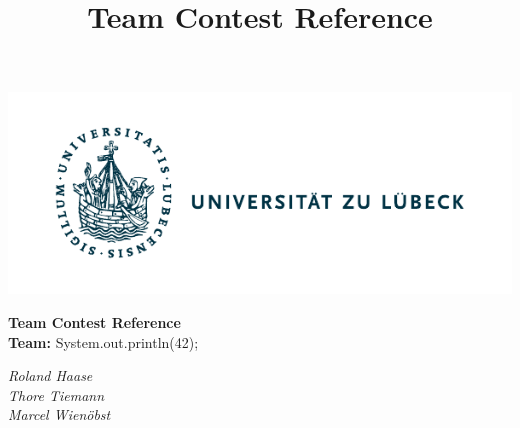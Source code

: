 \documentclass[10pt,a4paper,ngerman,oneside,]{article}
\title{Team Contest Reference}
\author{\university}
\newcommand\teamname{System.out.println(42);}
\newcommand\teammembers{Roland Haase\\ Thore Tiemann\\ Marcel Wienöbst}
\begin{document}
\vspace{-5mm}
\begin{center}
	\begin{minipage}{0.3\textwidth}
	  \includegraphics[scale=.8,clip,trim=.4cm 0cm 6.4cm 0cm,scale=0.89]{img/logo_uzl.pdf}
    \end{minipage}
	\begin{minipage}{0.35\textwidth}
      \begin{center}
	    \LARGE{\bfseries Team Contest Reference}\\
        \textbf{Team:} {\teamname}
      \end{center}
    \end{minipage}
	\begin{minipage}{0.3\textwidth}
      \flushright
      \itshape\teammembers
    \end{minipage}
\end{center}
\thispagestyle{fancy}
\tableofcontents
\end{document}
